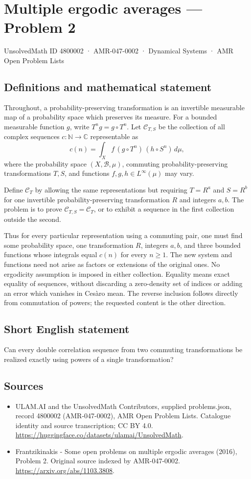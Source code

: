 \documentclass[11pt,a4paper]{article}
\begin{document}
\section*{Multiple ergodic averages — Problem 2}\label{4800002}
{\small UnsolvedMath ID 4800002 · AMR-047-0002 · Dynamical Systems · AMR Open Problem Lists}
\subsection{Definitions and mathematical statement}
Throughout, a probability-preserving transformation is an invertible
measurable map of a probability space which preserves its measure.
For a bounded measurable function $g$, write $T^ng=g\circ T^n$.
Let $\mathcal C_{T,S}$ be the collection of all complex sequences
$c:\mathbb N\to\mathbb C$ representable as
\[
             c(n)=\int_X f\,(g\circ T^n)\,(h\circ S^n)\,d\mu,
\]
where the probability space $(X,\mathcal B,\mu)$, commuting
probability-preserving transformations $T,S$, and functions
$f,g,h\in L^\infty(\mu)$ may vary.

Define $\mathcal C_T$ by allowing the same representations but
requiring $T=R^a$ and $S=R^b$ for one invertible probability-preserving
transformation $R$ and integers $a,b$. The problem is to prove
$\mathcal C_{T,S}=\mathcal C_T$, or to exhibit a sequence in the
first collection outside the second.

Thus for every particular representation using a commuting pair,
one must find some probability space, one transformation $R$,
integers $a,b$, and three bounded functions whose integrals equal
$c(n)$ for every $n\ge1$. The new system and functions need
not arise as factors or extensions of the original ones.
No ergodicity assumption is imposed in either collection.
Equality means exact equality of sequences, without discarding
a zero-density set of indices or adding an error which vanishes
in Ces\`aro mean. The reverse inclusion follows directly from
commutation of powers; the requested content is the other direction.
\subsection{Short English statement}
Can every double correlation sequence from two commuting transformations be realized exactly using powers of a single transformation?
\subsection{Sources}
\begin{itemize}
\item[S1] ULAM.AI and the UnsolvedMath Contributors, supplied problems.json, record 4800002 (AMR-047-0002), AMR Open Problem Lists. Catalogue identity and source transcription; CC BY 4.0.
\url{https://huggingface.co/datasets/ulamai/UnsolvedMath}.
\item[S2] Frantzikinakis - Some open problems on multiple ergodic averages (2016), Problem 2. Original source indexed by AMR-047-0002.
\url{https://arxiv.org/abs/1103.3808}.
\end{itemize}
\end{document}
